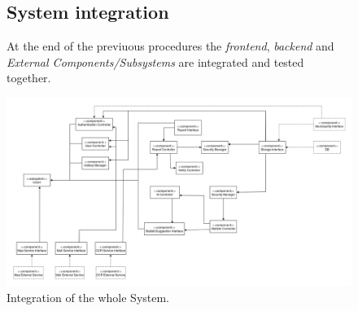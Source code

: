 \documentclass{report}
\begin{document}
\begin{figure}[!ht]
    \subsection{System integration}
At the end of the previuous procedures the \textit{frontend}, \textit{backend} and \textit{External Components/Subsystems} are integrated and tested together.
\vspace{1cm}    
\begin{center}
	\includegraphics[width=\textwidth]{img/SystemSub.png}
    \end{center}
    \label{fig:SysSub}
	\caption{Integration of the whole System.}
\end{figure}
\end{document}
